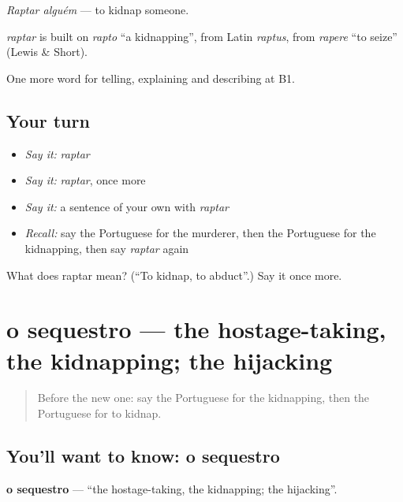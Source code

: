\emph{Raptar alguém} — to kidnap someone.

\begin{cousinweb}
\emph{raptar} is built on \emph{rapto} \textquotedblleft{}a kidnapping\textquotedblright{}, from Latin \emph{raptus}, from \emph{rapere} \textquotedblleft{}to seize\textquotedblright{} (Lewis \& Short).
\end{cousinweb}

\begin{grammarlens}[title={What you've built}]
One more word for telling, explaining and describing at B1.
\end{grammarlens}

\subsection*{Your turn}
\begin{itemize}
\raggedright
  \item \emph{Say it:} \emph{raptar}
  \item \emph{Say it:} \emph{raptar}, once more
  \item \emph{Say it:} a sentence of your own with \emph{raptar}
  \item \emph{Recall:} say the Portuguese for the murderer, then the Portuguese for the kidnapping, then say \emph{raptar} again
\end{itemize}

\begin{tcolorbox}[breakable,colback=teal!4,colframe=teal!35!black,title={Before you move on}]
What does raptar mean? (\textquotedblleft{}To kidnap, to abduct\textquotedblright{}.) Say it once more.
\end{tcolorbox}
\section[o sequestro]{o sequestro — the hostage-taking, the kidnapping; the hijacking}

\label{lesson:PT-C291-sequestro}



\begin{quote}
Before the new one: say the Portuguese for the kidnapping, then the Portuguese for to kidnap.
\end{quote}

\subsection*{You'll want to know: o sequestro}
\textbf{o sequestro} — \textquotedblleft{}the hostage-taking, the kidnapping; the hijacking\textquotedblright{}.

